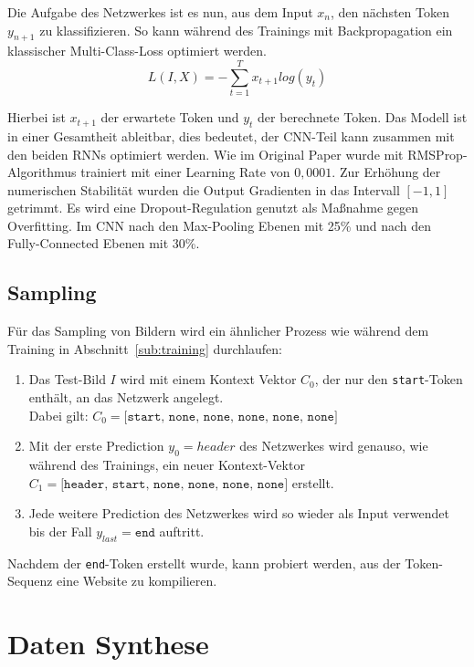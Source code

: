 \documentclass[pdftex,a4paper,halfparskip, article]{scrartcl}
\begin{document}
Die Aufgabe des Netzwerkes ist es nun, aus dem Input $x_n$, den nächsten Token $y_{n+1}$ zu klassifizieren. So kann während des Trainings mit Backpropagation ein klassischer Multi-Class-Loss optimiert werden.
\begin{equation}
L(I, X) =  -\sum_{t=1}^T x_{t+1} log(y_t)
\end{equation}

Hierbei ist $x_{t+1}$ der erwartete Token und $y_t$ der berechnete Token. Das Modell ist in einer Gesamtheit ableitbar, dies bedeutet, der CNN-Teil kann zusammen mit den beiden RNNs optimiert werden. Wie im Original Paper wurde mit RMSProp-Algorithmus trainiert mit einer Learning Rate von $0,0001$. Zur Erhöhung der numerischen Stabilität wurden die Output Gradienten in das Intervall $[-1,1]$ getrimmt. Es wird eine Dropout-Regulation genutzt als  Maßnahme gegen Overfitting. Im CNN nach den Max-Pooling Ebenen mit 25\% und nach den Fully-Connected Ebenen mit 30\%.


\subsection{Sampling}\label{sub:sampling}

Für das Sampling von Bildern wird ein ähnlicher Prozess wie während dem Training in Abschnitt~\ref{sub:training} durchlaufen:

\begin{enumerate}
	\item Das Test-Bild $I$ wird mit einem Kontext Vektor $C_0$, der nur den \texttt{start}-Token enthält, an das Netzwerk angelegt. \\ Dabei gilt: $C_0 = \texttt{[start, none, none, none, none, none]}$ 
	\item Mit der erste Prediction $y_0 = header$ des Netzwerkes wird genauso, wie während des Trainings, ein neuer Kontext-Vektor $C_1 = \texttt{[header, start, none, none, none, none]}$ erstellt.
	\item Jede weitere Prediction des Netzwerkes wird so wieder als Input verwendet bis der Fall $y_{last} = \texttt{end}$ auftritt. 
\end{enumerate}

Nachdem der \texttt{end}-Token erstellt wurde, kann probiert werden, aus der Token-Sequenz eine Website zu kompilieren. 

\newpage
\section{Daten Synthese}
\end{document}
